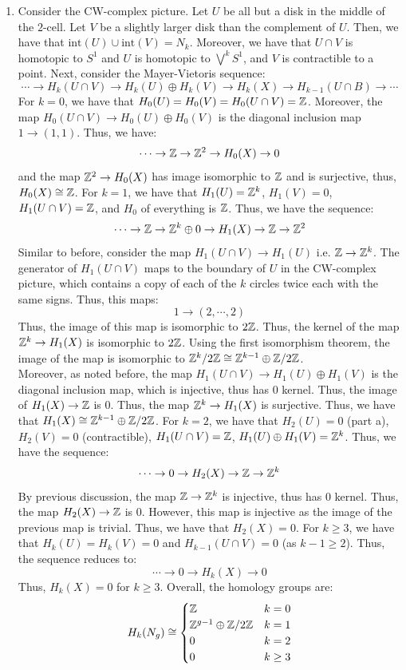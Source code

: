\documentclass[12pt]{article}
\begin{document}
\begin{solution}
\begin{enumerate}
        \item Consider the CW-complex picture. Let $U$ be all but a disk in the middle of the $2$-cell. Let $V$ be a slightly larger disk than the complement of $U$. Then, we have that $\text{int}(U) \cup \text{int}(V) = N_k$. Moreover, we have that $U \cap V$ is homotopic to $S^1$ and $U$ is homotopic to $\bigvee^{k} S^1$, and $V$ is contractible to a point. Next, consider the Mayer-Vietoris sequence:
        \[ \cdots \to H_k(U \cap V) \to H_k(U) \oplus H_k(V) \to H_k(X) \to H_{k-1}(U \cap B) \to \cdots\]
        For $k = 0$, we have that $H_0(U) = H_0(V) = H_0(U \cap V) = \mathbb Z$. Moreover, the map $H_0(U \cap V) \to H_0(U) \oplus H_0(V)$ is the diagonal inclusion map $1 \to (1, 1)$. Thus, we have: 
        \[ \cdots \to \mathbb Z \to \mathbb Z^2 \to H_0(X) \to 0\]
        and the map $\mathbb Z^2 \to H_0(X)$ has image isomorphic to $\mathbb Z$ and is surjective, thus, $H_0(X) \cong \mathbb Z$. \bbni
        For $k = 1$, we have that $H_1(U) = \mathbb Z^k$, $H_1(V) = 0$, $H_1(U \cap V) = \mathbb Z$, and $H_0$ of everything is $\mathbb Z$. Thus, we have the sequence:
        \[ \cdots \to \mathbb Z \to \mathbb Z^k \oplus 0 \to H_1(X) \to \mathbb Z \to \mathbb Z^2\]
        Similar to before, consider the map $H_1(U \cap V) \to H_1(U)$ i.e. $\mathbb Z \to \mathbb Z^k$. The generator of $H_1(U \cap V)$ maps to the boundary of $U$ in the CW-complex picture, which contains a copy of each of the $k$ circles twice each with the same signs. Thus, this maps: 
        \[ 1 \to (2, \cdots, 2)\] 
        Thus, the image of this map is isomorphic to $2\mathbb Z$. Thus, the kernel of the map $\mathbb Z^k \to H_1(X)$ is isomorphic to $2\mathbb Z$. Using the first isomorphism theorem, the image of the map is isomorphic to $\mathbb Z^k/2\mathbb Z \cong \mathbb Z^{k-1}\oplus \mathbb Z/2\mathbb Z$. \\
        Moreover, as noted before, the map $H_1(U \cap V) \to H_1(U) \oplus H_1(V)$ is the diagonal inclusion map, which is injective, thus has $0$ kernel. Thus, the image of $H_1(X) \to \mathbb Z$ is $0$. Thus, the map $\mathbb Z^k \to H_1(X)$ is surjective. Thus, we have that $H_1(X) \cong \mathbb Z^{k-1} \oplus \mathbb Z/2\mathbb Z$. \bbni
        For $k = 2$, we have that $H_2(U) = 0$ (part a), $H_2(V) = 0$ (contractible), $H_1(U \cap V) = \mathbb Z$, $H_1(U)\oplus H_1(V) = \mathbb Z^k$. Thus, we have the sequence:
        \[ \cdots \to 0 \to H_2(X) \to \mathbb Z \to \mathbb Z^k \]
        By previous discussion, the map $\mathbb Z \to \mathbb Z^k$ is injective, thus has $0$ kernel. Thus, the map $H_2(X) \to \mathbb Z$ is $0$. However, this map is injective as the image of the previous map is trivial. Thus, we have that $H_2(X) = 0$. \bbni
        For $k \geq 3$, we have that $H_k(U) = H_k(V) = 0$ and $H_{k-1}(U \cap V) = 0$ (as $k-1 \geq 2$). Thus, the sequence reduces to:
        \[ \cdots \to 0 \to H_k(X) \to 0\]
        Thus, $H_k(X) = 0$ for $k \geq 3$. \bbni
        Overall, the homology groups are:
        \[ H_k(N_g) \cong \begin{cases} \mathbb Z & k = 0 \\ \mathbb Z^{g-1} \oplus \mathbb Z/2\mathbb Z & k = 1 \\ 0 & k = 2 \\ 0 & k \geq 3 \end{cases} \]


\end{enumerate}
\end{solution}
\end{document}
